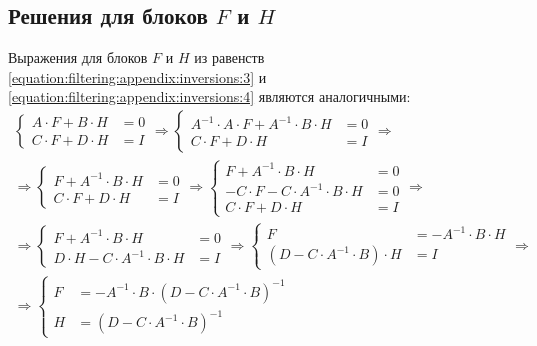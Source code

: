 \subsection{Решения для блоков $F$ и $H$}

Выражения для блоков $F$ и $H$ из равенств \eqref{equation:filtering:appendix:inversions:3} и \eqref{equation:filtering:appendix:inversions:4} являются
аналогичными:
\begin{gather*}
	\left \{
	\begin{array}{cl}
		A \cdot F + B \cdot H & = 0 \\
		C \cdot F + D \cdot H & = I
	\end{array}
	\right .
	\Rightarrow
	\left \{
	\begin{array}{cl}
		A^{-1} \cdot A \cdot F + A^{-1} \cdot B \cdot H & = 0 \\
		C \cdot F + D \cdot H & = I
	\end{array}
	\right .
	\Rightarrow \\
	\Rightarrow
	\left \{
	\begin{array}{cl}
		F + A^{-1} \cdot B \cdot H & = 0 \\
		C \cdot F + D \cdot H & = I
	\end{array}
	\right .
	\Rightarrow
	\left \{
	\begin{array}{cl}
		F + A^{-1} \cdot B \cdot H & = 0 \\
		-C \cdot F - C \cdot A^{-1} \cdot B \cdot H & = 0 \\
		C \cdot F + D \cdot H & = I
	\end{array}
	\right .
	\Rightarrow \\
	\Rightarrow
	\left \{
	\begin{array}{cl}
		F + A^{-1} \cdot B \cdot H & = 0 \\
		D \cdot H - C \cdot A^{-1} \cdot B \cdot H & = I
	\end{array}
	\right .
	\Rightarrow
	\left \{
	\begin{array}{cl}
		F & = - A^{-1} \cdot B \cdot H \\
		\left ( D - C \cdot A^{-1} \cdot B \right ) \cdot H & = I
	\end{array}
	\right .
	\Rightarrow \\
	\Rightarrow
	\left \{
	\begin{array}{cl}
		F & = - A^{-1} \cdot B \cdot \left ( D - C \cdot A^{-1} \cdot B \right )^{-1} \\
		H & = \left ( D - C \cdot A^{-1} \cdot B \right )^{-1}
	\end{array}
	\right .
\end{gather*}

